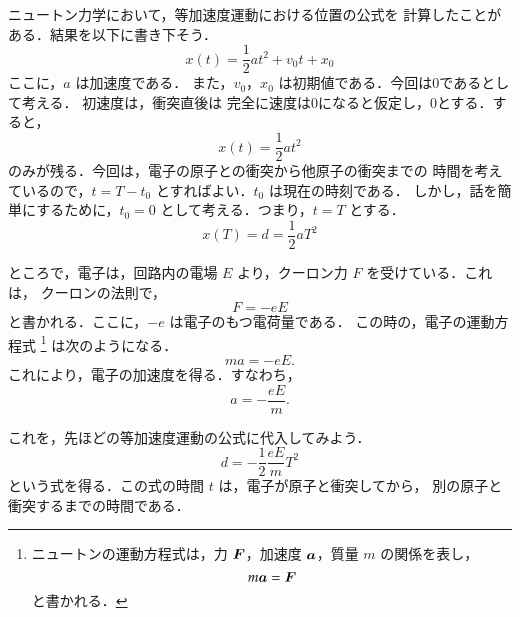            ニュートン力学において，等加速度運動における位置の公式を
            計算したことがある．結果を以下に書き下そう．
                \begin{equation*}
                    x(t) = \frac{1}{2} a t^{2}  +  v_{0}t + x_{0}
                \end{equation*}
            ここに，$a$ は加速度である．
            また，$v_{0}$，$x_{0}$ は初期値である．今回は0であるとして考える．
            初速度は，衝突直後は
            完全に速度は0になると仮定し，0とする．すると，
                \begin{equation*}
                    x(t) = \frac{1}{2} a t^{2}
                \end{equation*}
            のみが残る．今回は，電子の原子との衝突から他原子の衝突までの
            時間を考えているので，$t=T - t_{0}$ とすればよい．$t_{0}$ は現在の時刻である．
            しかし，話を簡単にするために，$t_{0} = 0$ として考える．つまり，$t = T$ とする．
                \begin{equation*}
                    x(T) = d = \frac{1}{2} a T^{2}
                \end{equation*}

            ところで，電子は，回路内の電場 $E$ より，クーロン力 $F$ を受けている．これは，
            クーロンの法則で，
                \begin{equation*}
                    F = -eE
                \end{equation*}
            と書かれる．ここに，$-e$ は電子のもつ電荷量である．
            この時の，電子の運動方程式
                \footnote{
                    ニュートンの運動方程式は，力 $\boldsymbol{F}$，加速度 $\boldsymbol{a}$，質量 $m$ の関係を表し，
                        \begin{equation*}
                            m\boldsymbol{a} = \boldsymbol{F}
                        \end{equation*}
                    と書かれる．
                }
            は次のようになる．
                \begin{equation*}
                    ma  =  -eE.
                \end{equation*}
            これにより，電子の加速度を得る．すなわち，
                \begin{equation*}
                    a  =  -\frac{eE}{m}.
                \end{equation*}

            これを，先ほどの等加速度運動の公式に代入してみよう．
                \begin{equation*}
                    d = -\frac{1}{2} \frac{eE}{m} T^{2}
                \end{equation*}
            という式を得る．この式の時間 $t$ は，電子が原子と衝突してから，
            別の原子と衝突するまでの時間である．

